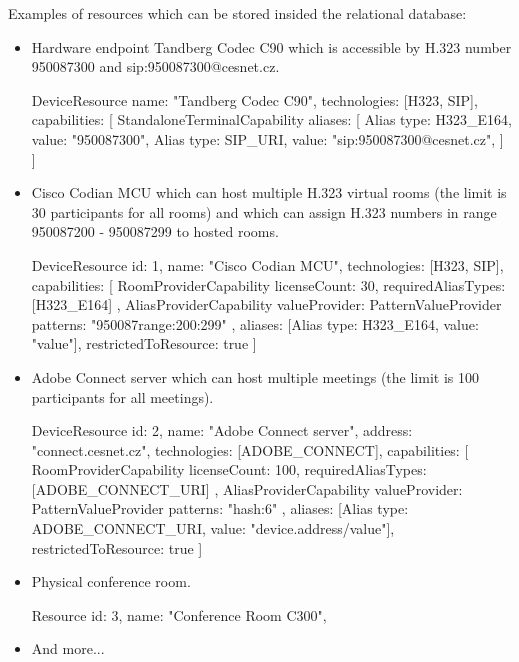 Examples of resources which can be stored insided the relational database:

\begin{itemize}

\item Hardware endpoint Tandberg Codec C90 which is accessible by H.323 number 950087300 and sip:950087300@cesnet.cz.
\begin{Entity}
DeviceResource {
  name: "Tandberg Codec C90",
  technologies: [H323, SIP],
  capabilities: [
    StandaloneTerminalCapability {
      aliases: [
        Alias { type: H323_E164, value: "950087300"},
        Alias { type: SIP_URI,   value: "sip:950087300@cesnet.cz"},  	  	
      ]
    }
  ] 
}
\end{Entity}

\newpage
\item Cisco Codian MCU which can host multiple H.323 virtual rooms (the limit is 30 participants for all rooms) and which can assign H.323 numbers in range 950087200 - 950087299 to hosted rooms.
\begin{Entity}
DeviceResource {
  id: 1,
  name: "Cisco Codian MCU",
  technologies: [H323, SIP],
  capabilities: [
    RoomProviderCapability {
      licenseCount: 30,
      requiredAliasTypes: [H323_E164]
    },
    AliasProviderCapability {
      valueProvider: PatternValueProvider {
        patterns: "950087{range:200:299}"
      },
      aliases: [Alias { type: H323_E164, value: "{value}"}],
      restrictedToResource: true 
    }
  ]
}
\end{Entity}

\item Adobe Connect server which can host multiple meetings (the limit is 100 participants for all meetings).
\begin{Entity}
DeviceResource {
  id: 2,
  name: "Adobe Connect server",
  address: "connect.cesnet.cz",
  technologies: [ADOBE_CONNECT],
  capabilities: [
    RoomProviderCapability {
      licenseCount: 100,
      requiredAliasTypes: [ADOBE_CONNECT_URI]
    },
    AliasProviderCapability {
      valueProvider: PatternValueProvider {
        patterns: "{hash:6}"
      },
      aliases: [Alias { type: ADOBE_CONNECT_URI, value: "{device.address}/{value}"}],
      restrictedToResource: true 
    }
  ]
}
\end{Entity}

\item Physical conference room.

\begin{Entity}
Resource {
  id: 3,
  name: "Conference Room C300",
}
\end{Entity}

\item And more...

\end{itemize}



